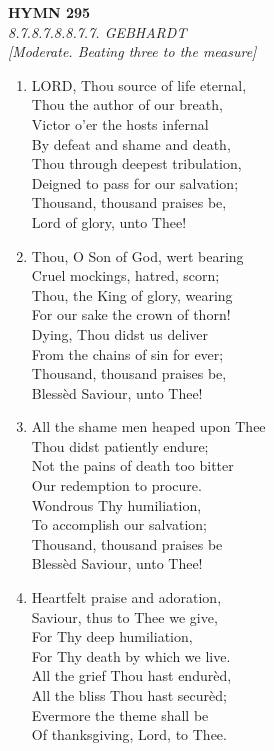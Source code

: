 \newpage
\begin{center}
    {\Large \textbf{HYMN 295}}
    \\
    \textit{8.7.8.7.8.8.7.7. GEBHARDT}
    \\
    \textit{\small [Moderate. Beating three to the measure]}
\end{center}
\vspace{1em}

\begin{enumerate}
    \item LORD, Thou source of life eternal, \\
        Thou the author of our breath, \\
        Victor o'er the hosts infernal \\
        By defeat and shame and death, \\
        Thou through deepest tribulation, \\
        Deigned to pass for our salvation; \\
        Thousand, thousand praises be, \\
        Lord of glory, unto Thee!

    \item Thou, O Son of God, wert bearing \\
        Cruel mockings, hatred, scorn; \\
        Thou, the King of glory, wearing \\
        For our sake the crown of thorn! \\
        Dying, Thou didst us deliver \\
        From the chains of sin for ever; \\
        Thousand, thousand praises be, \\
        Bless\`ed Saviour, unto Thee!

    \item All the shame men heaped upon Thee \\
        Thou didst patiently endure; \\
        Not the pains of death too bitter \\
        Our redemption to procure. \\
        Wondrous Thy humiliation, \\
        To accomplish our salvation; \\
        Thousand, thousand praises be \\
        Bless\`ed Saviour, unto Thee!

    \item Heartfelt praise and adoration, \\
        Saviour, thus to Thee we give, \\
        For Thy deep humiliation, \\
        For Thy death by which we live. \\
        All the grief Thou hast endur\`ed, \\
        All the bliss Thou hast secur\`ed; \\
        Evermore the theme shall be \\
        Of thanksgiving, Lord, to Thee.

\end{enumerate}

